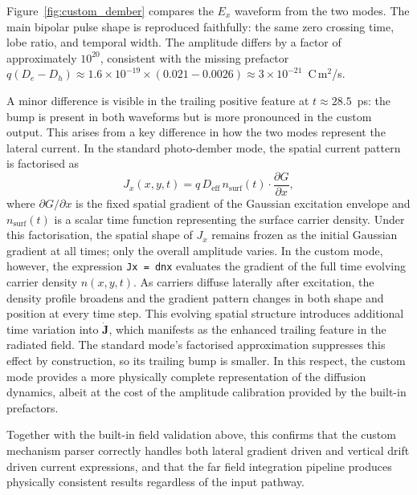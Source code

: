 \documentclass[12pt]{final_project_report}
\begin{document}
Figure~\ref{fig:custom_dember} compares the $E_x$ waveform from the two modes. The main bipolar pulse shape is reproduced faithfully: the same zero crossing time, lobe ratio, and temporal width. The amplitude differs by a factor of approximately $10^{20}$, consistent with the missing prefactor $q(D_e - D_h) \approx 1.6 \times 10^{-19} \times (0.021 - 0.0026) \approx 3 \times 10^{-21}$~C\,m$^2$/s.

A minor difference is visible in the trailing positive feature at $t \approx 28.5$~ps: the bump is present in both waveforms but is more pronounced in the custom output. This arises from a key difference in how the two modes represent the lateral current. In the standard photo-dember mode, the spatial current pattern is factorised as
\begin{equation}
    J_x(x,y,t) = q\,D_{\mathrm{eff}}\, n_{\mathrm{surf}}(t) \cdot \frac{\partial G}{\partial x},
\end{equation}
where $\partial G/\partial x$ is the fixed spatial gradient of the Gaussian excitation envelope and $n_{\mathrm{surf}}(t)$ is a scalar time function representing the surface carrier density. Under this factorisation, the spatial shape of $J_x$ remains frozen as the initial Gaussian gradient at all times; only the overall amplitude varies. In the custom mode, however, the expression \texttt{Jx~=~dnx} evaluates the gradient of the full time evolving carrier density $n(x,y,t)$. As carriers diffuse laterally after excitation, the density profile broadens and the gradient pattern changes in both shape and position at every time step. This evolving spatial structure introduces additional time variation into $\dot{\mathbf{J}}$, which manifests as the enhanced trailing feature in the radiated field. The standard mode's factorised approximation suppresses this effect by construction, so its trailing bump is smaller. In this respect, the custom mode provides a more physically complete representation of the diffusion dynamics, albeit at the cost of the amplitude calibration provided by the built-in prefactors.

Together with the built-in field validation above, this confirms that the custom mechanism parser correctly handles both lateral gradient driven and vertical drift driven current expressions, and that the far field integration pipeline produces physically consistent results regardless of the input pathway.
\end{document}
